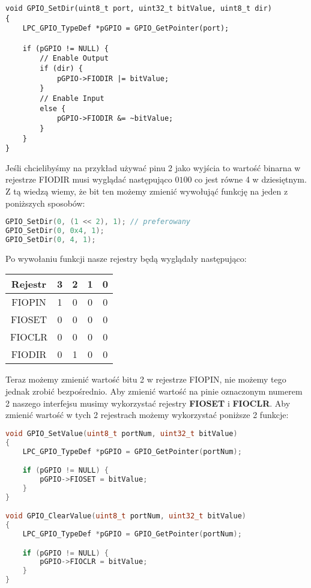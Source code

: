\documentclass[11pt]{article}
\begin{document}
\begin{lstlisting}
void GPIO_SetDir(uint8_t port, uint32_t bitValue, uint8_t dir)
{
	LPC_GPIO_TypeDef *pGPIO = GPIO_GetPointer(port);

	if (pGPIO != NULL) {
		// Enable Output
		if (dir) {
			pGPIO->FIODIR |= bitValue;
		}
		// Enable Input
		else {
			pGPIO->FIODIR &= ~bitValue;
		}
	}
}
\end{lstlisting}

Jeśli chcielibyśmy na przykład używać pinu 2 jako wyjścia to wartość binarna
w rejestrze FIODIR musi wyglądać następująco $0100$ co jest równe 4 w dziesiętnym.
Z tą wiedzą wiemy, że bit ten możemy zmienić wywołująć funkcję na jeden z poniższych sposobów:

\begin{lstlisting}[language=c]
GPIO_SetDir(0, (1 << 2), 1); // preferowany
GPIO_SetDir(0, 0x4, 1);
GPIO_SetDir(0, 4, 1);
\end{lstlisting}
\newpage
Po wywołaniu funkcji nasze rejestry będą wyglądały następująco:
\begin{table}[H]
    \centering
    \begin{tabular}{|c|c|c|c|c|}
        \hline
        Rejestr & 3 & 2 & 1 & 0 \\ \hline
        FIOPIN & 1 & 0 & 0 & 0 \\ \hline
        FIOSET & 0 & 0 & 0 & 0 \\ \hline
        FIOCLR & 0 & 0 & 0 & 0 \\ \hline
        FIODIR & 0 & 1 & 0 & 0 \\ \hline
    \end{tabular}
\end{table}
Teraz możemy zmienić wartość bitu 2 w rejestrze FIOPIN, nie możemy tego jednak zrobić
bezpośrednio. Aby zmienić wartość na pinie oznaczonym numerem 2 naszego interfejsu
musimy wykorzystać rejestry \textbf{FIOSET} i \textbf{FIOCLR}. Aby zmienić wartość
w tych 2 rejestrach możemy wykorzystać poniższe 2 funkcje:
\begin{lstlisting}[language=c]
void GPIO_SetValue(uint8_t portNum, uint32_t bitValue)
{
    LPC_GPIO_TypeDef *pGPIO = GPIO_GetPointer(portNum);

    if (pGPIO != NULL) {
        pGPIO->FIOSET = bitValue;
    }
}

void GPIO_ClearValue(uint8_t portNum, uint32_t bitValue)
{
	LPC_GPIO_TypeDef *pGPIO = GPIO_GetPointer(portNum);

	if (pGPIO != NULL) {
		pGPIO->FIOCLR = bitValue;
	}
}
\end{lstlisting}
\end{document}
